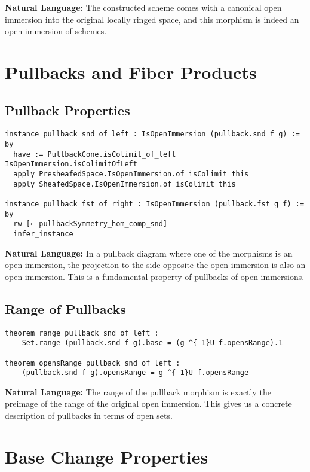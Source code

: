 \documentclass{article}
\theoremstyle{definition}
\begin{document}
\textbf{Natural Language:} The constructed scheme comes with a canonical open immersion into the original locally ringed space, and this morphism is indeed an open immersion of schemes.

\section{Pullbacks and Fiber Products}

\subsection{Pullback Properties}

\begin{lstlisting}
instance pullback_snd_of_left : IsOpenImmersion (pullback.snd f g) := by
  have := PullbackCone.isColimit_of_left IsOpenImmersion.isColimitOfLeft
  apply PresheafedSpace.IsOpenImmersion.of_isColimit this
  apply SheafedSpace.IsOpenImmersion.of_isColimit this

instance pullback_fst_of_right : IsOpenImmersion (pullback.fst g f) := by
  rw [← pullbackSymmetry_hom_comp_snd]
  infer_instance
\end{lstlisting}

\textbf{Natural Language:} In a pullback diagram where one of the morphisms is an open immersion, the projection to the side opposite the open immersion is also an open immersion. This is a fundamental property of pullbacks of open immersions.

\subsection{Range of Pullbacks}

\begin{lstlisting}
theorem range_pullback_snd_of_left :
    Set.range (pullback.snd f g).base = (g ^{-1}U f.opensRange).1

theorem opensRange_pullback_snd_of_left :
    (pullback.snd f g).opensRange = g ^{-1}U f.opensRange
\end{lstlisting}

\textbf{Natural Language:} The range of the pullback morphism is exactly the preimage of the range of the original open immersion. This gives us a concrete description of pullbacks in terms of open sets.

\section{Base Change Properties}
\end{document}
